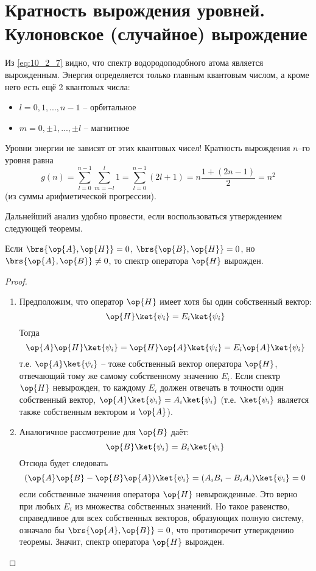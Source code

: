 \begin{sloppypar}
\section{Кратность вырождения уровней. Кулоновское (случайное) вырождение}
\end{sloppypar}

Из \eqref{eq:10_2_7} видно, что спектр водородоподобного атома является вырожденным. Энергия определяется только главным квантовым числом, а кроме него есть ещё 2 квантовых числа:
\begin{itemize}
\item $l = 0, 1, ..., n-1$ -- орбитальное
\item $m = 0, \pm 1, ..., \pm l$ -- магнитное
\end{itemize}

Уровни энергии не зависят от этих квантовых чисел! Кратность вырождения $n$–го уровня равна
$$
g(n) = \sum_{l=0}^{n-1} \sum_{m=-l}^{l} 1 = \sum_{l=0}^{n-1} (2l + 1) = n \frac{1+(2n-1)}{2} = n^2
$$
\noindent (из суммы арифметической прогрессии).

Дальнейший анализ удобно провести, если воспользоваться утверждением следующей теоремы.

\begin{thm}
\label{thm:1_1}
Если $\brs{\op{A}, \op{H}} = 0$, $\brs{\op{B}, \op{H}} = 0$, но $\brs{\op{A}, \op{B}} \neq 0$, то спектр оператора $\op{H}$ вырожден.
\end{thm}

\begin{proof}
\begin{enumerate}
\item Предположим, что оператор $\op{H}$ имеет хотя бы один собственный вектор:
$$
\op{H}\ket{\psi_i} = E_i \ket{\psi_i}
$$%
%
Тогда
$$
\op{A}\op{H}\ket{\psi_i} = \op{H}\op{A}\ket{\psi_i} = E_i \op{A}\ket{\psi_i}
$$%
%
т.е. $\op{A}\ket{\psi_i}$ -- тоже собственный вектор оператора $\op{H}$, отвечающий тому же самому собственному значению $E_i$. Если спектр $\op{H}$ невырожден, то каждому $E_i$ должен отвечать в точности один собственный вектор, $\op{A}\ket{\psi_i} = A_i \ket{\psi_i}$ (т.е. $\ket{\psi_i}$ является также собственным вектором и $\op{A}$).

\item Аналогичное рассмотрение для $\op{B}$ даёт:
$$
\op{B}\ket{\psi_i} = B_i \ket{\psi_i}
$$%
%
Отсюда будет следовать
$$
(\op{A}\op{B} - \op{B}\op{A}) \ket{\psi_i} = (A_i B_i - B_i A_i) \ket{\psi_i} = 0
$$%
%
если собственные значения оператора $\op{H}$ невырожденные. Это верно при любых $E_i$ из множества собственных значений. Но такое равенство, справедливое для всех собственных векторов, образующих полную систему, означало бы $\brs{\op{A}, \op{B}} = 0$, что противоречит утверждению теоремы. Значит, спектр оператора $\op{H}$ вырожден.
\end{enumerate}
\end{proof}

